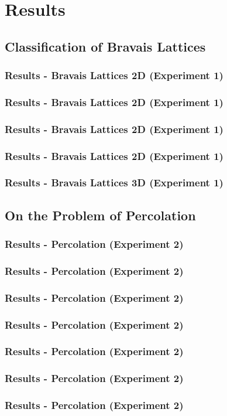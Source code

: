 \documentclass{beamer}
\begin{document}
\section{Results}
\subsection{Classification of Bravais Lattices}
\begin{frame}
    \frametitle{Results - Bravais Lattices 2D (Experiment 1)}
    
\end{frame}
\begin{frame}
    \frametitle{Results - Bravais Lattices 2D (Experiment 1)}
    
\end{frame}
\begin{frame}
    \frametitle{Results - Bravais Lattices 2D (Experiment 1)}
    
\end{frame}
\begin{frame}
    \frametitle{Results - Bravais Lattices 2D (Experiment 1)}
    
\end{frame}
\begin{frame}
    \frametitle{Results - Bravais Lattices 3D (Experiment 1)}
    
\end{frame}
\subsection{On the Problem of Percolation}
\begin{frame}
    \frametitle{Results - Percolation (Experiment 2)}
    
\end{frame}
\begin{frame}
    \frametitle{Results - Percolation (Experiment 2)}
    
\end{frame}
\begin{frame}
    \frametitle{Results - Percolation (Experiment 2)}
    
\end{frame}
\begin{frame}
    \frametitle{Results - Percolation (Experiment 2)}
    
\end{frame}
\begin{frame}
    \frametitle{Results - Percolation (Experiment 2)}
    
\end{frame}
\begin{frame}
    \frametitle{Results - Percolation (Experiment 2)}
    
\end{frame}
\begin{frame}
    \frametitle{Results - Percolation (Experiment 2)}
    
\end{frame}
\end{document}
